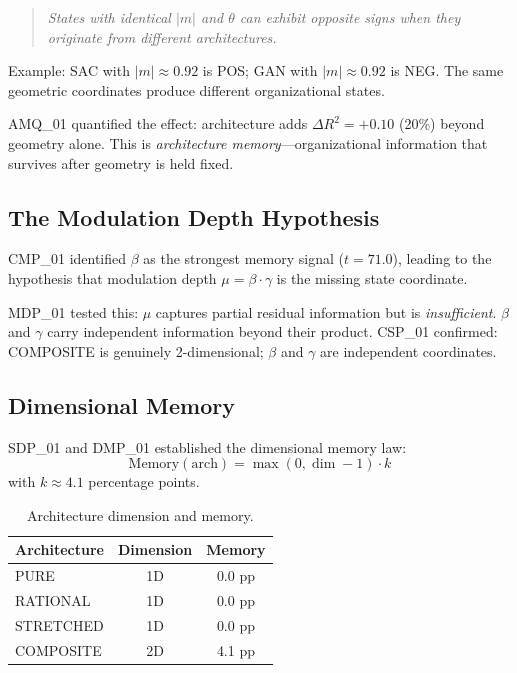\documentclass[11pt,a4paper,oneside]{report}
\begin{document}
\begin{quote}
  \textit{States with identical $|m|$ and $\theta$ can exhibit opposite signs
  when they originate from different architectures.}
\end{quote}

Example: SAC with $|m|\approx 0.92$ is POS; GAN with $|m|\approx 0.92$ is NEG.
The same geometric coordinates produce different organizational states.

AMQ\_01 quantified the effect: architecture adds $\Delta R^2 = +0.10$ (20\%)
beyond geometry alone. This is \textit{architecture memory}---organizational
information that survives after geometry is held fixed.

\subsection{The Modulation Depth Hypothesis}

CMP\_01 identified $\beta$ as the strongest memory signal ($t = 71.0$),
leading to the hypothesis that modulation depth $\mu = \beta\cdot\gamma$ is
the missing state coordinate.

MDP\_01 tested this: $\mu$ captures partial residual information but is
\textit{insufficient}. $\beta$ and $\gamma$ carry independent information
beyond their product. CSP\_01 confirmed: COMPOSITE is genuinely 2-dimensional;
$\beta$ and $\gamma$ are independent coordinates.

\subsection{Dimensional Memory}

SDP\_01 and DMP\_01 established the dimensional memory law:
\begin{equation}
  \text{Memory}(\text{arch}) = \max(0, \dim - 1) \cdot k
  \label{eq:dimmem}
\end{equation}
with $k \approx 4.1$ percentage points.

\begin{table}[h]
\centering
\caption{Architecture dimension and memory.}
\label{tab:dimmem}
\begin{tabular}{lcc}
\toprule
\textbf{Architecture} & \textbf{Dimension} & \textbf{Memory}\\
\midrule
PURE      & 1D & 0.0 pp\\
RATIONAL  & 1D & 0.0 pp\\
STRETCHED & 1D & 0.0 pp\\
COMPOSITE & 2D & 4.1 pp\\
\bottomrule
\end{tabular}
\end{table}
\end{document}
